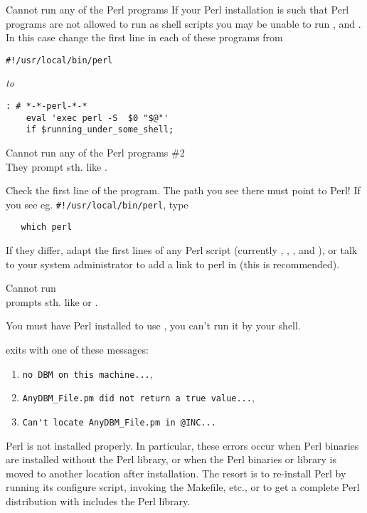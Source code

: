 \begin{htmllist}
\item [Cannot run any of the Perl programs]
If your Perl installation is such that Perl programs are not allowed 
to run as shell scripts you may be unable to run  ,  
and  . In this case change the first line in each of these
programs from
\begin{verbatim}
#!/usr/local/bin/perl
\end{verbatim}

\emph{to}

\begin{verbatim}
: # *-*-perl-*-*
    eval 'exec perl -S  $0 "$@"'
    if $running_under_some_shell; 
\end{verbatim}


\item [Cannot run any of the Perl programs \#2]\hfill\\
They prompt sth. like .

Check the first line of the program.
The path you see there must point to Perl!
If you see eg. \verb|#!/usr/local/bin/perl|, type
\begin{verbatim}
   which perl
\end{verbatim}
If they differ, adapt the first lines of any Perl script (currently
, , , and ),
or talk to your system administrator to add a link to perl in
 (this is recommended).


\item [Cannot run \fn{latex2html}]\hfill\\
 prompts sth. like  or
.

You must have Perl installed to use \latextohtml, you can't run it
by your shell.


\item [\fn{latex2html} exits with one of these messages:]\hfill

\begin{enumerate}
\item \verb/no DBM on this machine.../,
\item \verb/AnyDBM_File.pm did not return a true value.../,
\item \verb/Can't locate AnyDBM_File.pm in @INC.../
\end{enumerate}

Perl is not installed properly.
In particular, these errors occur when Perl binaries are installed
without the Perl library, or when the Perl binaries or library
is moved to another location after installation.
The resort is to re-install Perl by running its configure script,
invoking the Makefile, etc., or to get a complete Perl distribution
with includes the Perl library.



\end{htmllist}
